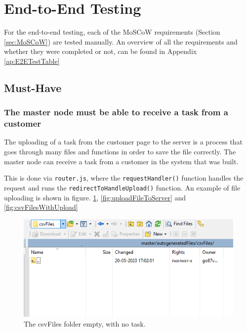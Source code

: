 \section{End-to-End Testing} \label{sec:E2ETesting}
For the end-to-end testing, each of the MoSCoW requirements (Section \ref{sec:MoSCoW}) are tested manually. An overview of all the requirements and whether they were completed or not, can be found in Appendix \ref{ap:E2ETestTable}

\subsection{Must-Have}

\subsubsection{The master node must be able to receive a task from a customer} \label{sssec:mustreceivetask}
The uploading of a task from the customer page to the server is a process that goes through many files and functions in order to save the file correctly. The master node can receive a task from a customer in the system that was built.


This is done via \lstinline{router.js}, where the \lstinline{requestHandler()} function handles the request and runs the \lstinline{redirectToHandleUpload()} function. An example of file uploading is shown in figure. \ref{fig:csvFilesEmpty}, \ref{fig:uploadFileToServer} and \ref{fig:csvFilesWithUpload}

\begin{figure}[H]
    \centering
    \includegraphics[scale=.5]{figures/csvFilesEmpty.png}
    \caption{The csvFiles folder empty, with no task.}
    \label{fig:csvFilesEmpty}
\end{figure}


